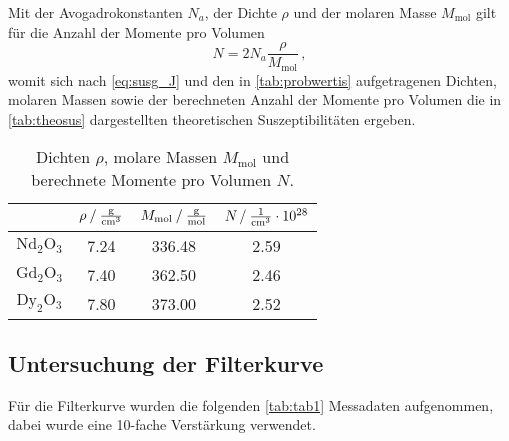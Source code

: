 Mit der Avogadrokonstanten $N_a$, der Dichte $\rho$ und der molaren Masse $M_\text{mol}$ gilt für die Anzahl der Momente pro Volumen
\begin{equation}
    N = 2 N_a \dfrac{\rho}{M_\text{mol}} \,,
\end{equation}
womit sich nach \eqref{eq:susg_J} und den in \autoref{tab:probwertis} aufgetragenen Dichten, molaren Massen sowie der berechneten Anzahl der Momente pro Volumen
die in \autoref{tab:theosus} dargestellten theoretischen Suszeptibilitäten ergeben.

\begin{table}[H]
    \centering
    \caption{Dichten $\rho$, molare Massen $M_\text{mol}$ und berechnete Momente pro Volumen $N$.}
    \label{tab:probwertis}
    \begin{tabular}{S S[table-format=1.2] S[table-format=3.2] S[table-format=1.2]}
      \toprule
      {} & {$\rho \mathbin{/} \unit{\frac{\gram}{{\centi\meter}^3}}$} & {$M_\text{mol} \mathbin{/} \unit{\frac{\gram}{\mol}}$} & {$N \mathbin{/} \unit{\frac{1}{{\centi\meter}^3}} \cdot 10^{28}$}  \\
      \midrule
      {$\text{Nd}_2 \text{O}_3$}        &           7.24          &         336.48          &           2.59            \\
      {$\text{Gd}_2\text{O}_3$}         &           7.40          &         362.50          &           2.46            \\
      {$\text{Dy}_2\text{O}_3$}         &           7.80          &         373.00          &           2.52            \\
      \bottomrule
    \end{tabular}
\end{table}



\subsection{Untersuchung der Filterkurve}

Für die Filterkurve wurden die folgenden \autoref{tab:tab1} Messadaten aufgenommen, dabei wurde eine 10-fache Verstärkung verwendet.

